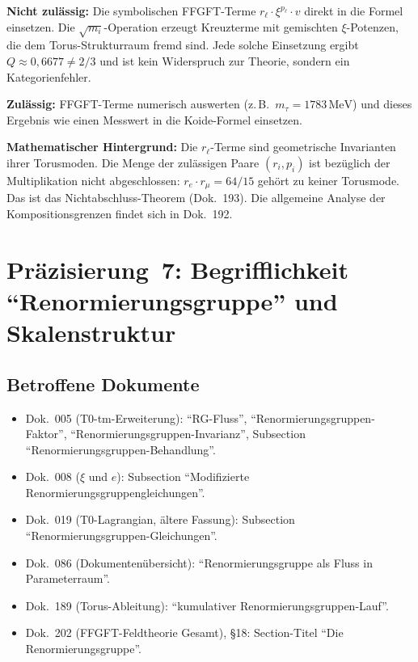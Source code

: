 \textbf{Nicht zulässig:} Die symbolischen FFGFT-Terme $r_\ell \cdot \xi^{p_\ell} \cdot v$
direkt in die Formel einsetzen. Die $\sqrt{m_i}$-Operation erzeugt Kreuzterme
mit gemischten $\xi$-Potenzen, die dem Torus-Strukturraum fremd sind.
Jede solche Einsetzung ergibt $Q \approx 0{,}6677 \neq 2/3$ und ist
kein Widerspruch zur Theorie, sondern ein Kategorienfehler.

\textbf{Zulässig:} FFGFT-Terme numerisch auswerten
(z.\,B.\ $m_\tau = 1783\,\text{MeV}$) und dieses Ergebnis
wie einen Messwert in die Koide-Formel einsetzen.

\textbf{Mathematischer Hintergrund:} Die $r_\ell$-Terme sind
geometrische Invarianten ihrer Torusmoden. Die Menge der zulässigen
Paare $(r_i, p_i)$ ist bezüglich der Multiplikation nicht abgeschlossen:
$r_e \cdot r_\mu = 64/15$ gehört zu keiner Torusmode.
Das ist das Nichtabschluss-Theorem (Dok.~193).
Die allgemeine Analyse der Kompositionsgrenzen findet sich in Dok.~192.

\section{\texorpdfstring{Präzisierung~7: Begrifflichkeit \enquote{Renormierungsgruppe} und Skalenstruktur}{Praezisierung 7: Begrifflichkeit Renormierungsgruppe und Skalenstruktur}}

\subsection*{Betroffene Dokumente}

\begin{itemize}
  \item Dok.~005 (T0-tm-Erweiterung): \enquote{RG-Fluss}, \enquote{Renormierungs\-gruppen-Faktor},
        \enquote{Renormierungs\-gruppen-Invarianz},
        Subsection \enquote{Renormierungs\-gruppen-Behandlung}.
  \item Dok.~008 ($\xi$ und $e$): Subsection \enquote{Modifizierte
        Renormierungs\-gruppen\-gleichungen}.
  \item Dok.~019 (T0-Lagrangian, ältere Fassung):
        Subsection \enquote{Renormierungs\-gruppen-Gleichungen}.
  \item Dok.~086 (Dokumentenübersicht): \enquote{Renormierungsgruppe als Fluss
        in Parameterraum}.
  \item Dok.~189 (Torus-Ableitung): \enquote{kumulativer
        Renormierungs\-gruppen-Lauf}.
  \item Dok.~202 (FFGFT-Feldtheorie Gesamt), \S 18:
        Section-Titel \enquote{Die Renormierungsgruppe}.
\end{itemize}

